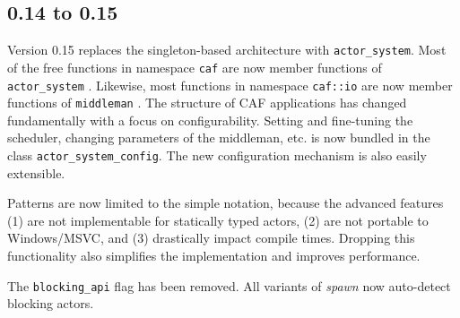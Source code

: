 \clearpage
\subsection{0.14 to 0.15}

Version 0.15 replaces the singleton-based architecture with
\lstinline^actor_system^. Most of the free functions in namespace
\lstinline^caf^ are now member functions of \lstinline^actor_system^
. Likewise, most functions in namespace \lstinline^caf::io^
are now member functions of \lstinline^middleman^ . The
structure of CAF applications has changed fundamentally with a focus on
configurability. Setting and fine-tuning the scheduler, changing parameters of
the middleman, etc. is now bundled in the class
\lstinline^actor_system_config^. The new configuration mechanism is also easily
extensible.

Patterns are now limited to the simple notation, because the advanced features
(1) are not implementable for statically typed actors, (2) are not portable to
Windows/MSVC, and (3) drastically impact compile times. Dropping this
functionality also simplifies the implementation and improves performance.

The \lstinline^blocking_api^ flag has been removed. All variants of
\emph{spawn} now auto-detect blocking actors.
